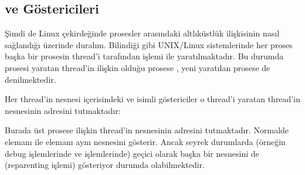\documentclass[a4paper,10pt,turkish]{sphinxmanual}
\begin{document}
\subsection{ ve  Göstericileri}
\label{\detokenize{processcontrolblock:real-parent-ve-parent-gostericileri}}
\sphinxAtStartPar
Şimdi de Linux çekirdeğinde prosesler arasındaki altlık\sphinxhyphen{}üstlük ilişkisinin nasıl sağlandığı üzerinde
duralım. Bilindiği gibi UNIX/Linux sistemlerinde her proses başka bir prosesin thread’i tarafından 
işlemi ile yaratılmaktadır. Bu durumda prosesi yaratan thread’in ilişkin olduğu prosese , yeni yaratılan prosese de  denilmektedir.

\sphinxAtStartPar
Her thread’in  nesnesi içerisindeki  ve  isimli göstericiler o
thread’i yaratan thread’in  nesnesinin adresini tutmaktadır:

\begin{sphinxVerbatim}[commandchars=\\\{\}]

\end{sphinxVerbatim}

\sphinxAtStartPar
Burada  üst prosese ilişkin thread’in  nesnesinin adresini tutmaktadır.
Normalde  elemanı ile  elemanı aynı  nesnesini gösterir. Ancak
seyrek durumlarda (örneğin debug işlemlerinde ve  işlemlerinde) geçici olarak  başka
bir  nesnesini de (reparenting işlemi) gösteriyor durumda olabilmektedir.
\end{document}
